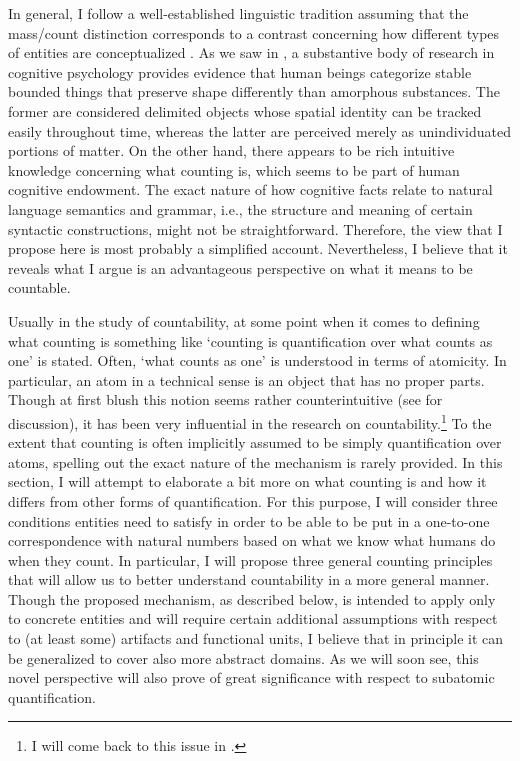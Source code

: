 In general, I follow a well-established linguistic tradition assuming that the mass\slash count distinction corresponds to a contrast concerning how different types of entities are conceptualized \citep[e.g.,][]{wierzbicka1988semantics,chierchia1998plurality,chierchia1998reference,chierchia2010mass,chierchia2015universal,grimm2012number}. As we saw in , a substantive body of research in cognitive psychology provides evidence that human beings categorize stable bounded things that preserve shape differently than amorphous substances. The former are considered delimited objects whose spatial identity can be tracked easily throughout time, whereas the latter are perceived merely as unindividuated portions of matter. On the other hand, there appears to be rich intuitive knowledge concerning what counting is, which seems to be part of human cognitive endowment. The exact nature of how cognitive facts relate to natural language semantics and grammar, i.e., the structure and meaning of certain syntactic constructions,  might not be straightforward. Therefore, the view that I propose here is most probably a simplified account. Nevertheless, I believe that it reveals what I argue is an advantageous perspective on what it means to be countable. 

Usually in the study of countability, at some point when it comes to defining what counting is something like `counting is quantification over what counts as one' is stated. Often, `what counts as one' is understood in terms of atomicity. In particular, an atom in a technical sense is an object that has no proper parts. Though at first blush this notion seems rather counterintuitive (see \citealt{champollion2010parts,champollion2017parts} for discussion), it has been very influential in the research on countability.\footnote{I will come back to this issue in .} To the extent that counting is often implicitly assumed to be simply quantification over atoms, spelling out the exact nature of the mechanism is rarely provided. In this section, I will attempt to elaborate a bit more on what counting is and how it differs from other forms of quantification. For this purpose, I will consider three conditions entities need to satisfy in order to be able to be put in a one-to-one correspondence with natural numbers based on what we know what humans do when they count. In particular, I will propose three general counting principles that will allow us to better understand countability in a more general manner. Though the proposed mechanism, as described below, is intended to apply only to concrete entities and will require certain additional assumptions with respect to (at least some) artifacts and functional units, I believe that in principle it can be generalized to cover also more abstract domains. As we will soon see, this novel perspective will also prove of great significance with respect to subatomic quantification.

